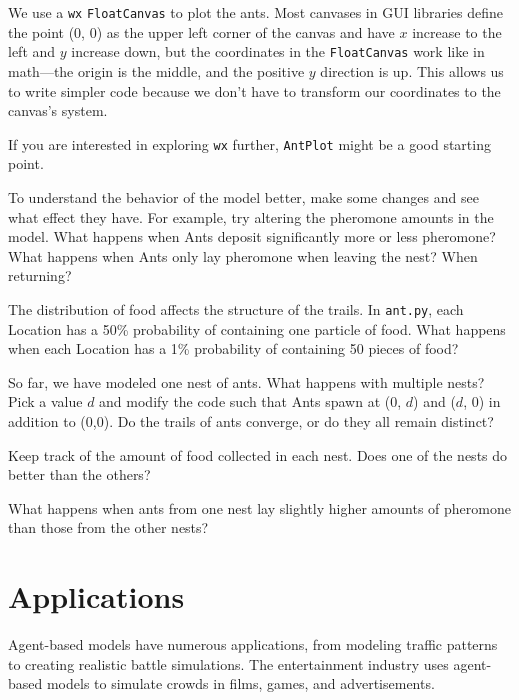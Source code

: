 \documentclass[10pt]{book}
\begin{document}
We use a {\tt wx} \texttt{FloatCanvas} to plot the ants.  Most
canvases in GUI libraries define the point (0, 0) as the upper left
corner of the canvas and have $x$ increase to the left and $y$ increase
down, but the coordinates in the \texttt{FloatCanvas} work like in
math---the origin is the middle, and the positive $y$ direction is up. This
allows us to write simpler code because we don't have to transform our
coordinates to the canvas's system.

If you are interested in exploring \texttt{wx}
further, \texttt{AntPlot} might be a good starting point.


\begin{exercise}

To understand the behavior of the model better, make some changes
and see what effect they have.  For example, try altering the
pheromone amounts in the model.
What
happens when Ants deposit significantly more or less pheromone?
What happens when
Ants only lay pheromone when leaving the nest? When returning? 
\end{exercise}

\begin{exercise}

The distribution of food affects the structure of the trails.
In \texttt{ant.py}, each Location has a 50\% probability of
containing one particle of food.  What happens when each Location has
a 1\% probability of containing 50 pieces of food?
\end{exercise}

\begin{exercise}

So far, we have modeled one nest of ants.
What happens with multiple nests? Pick a value $d$ and
modify the code such that Ants spawn at (0, $d$) and ($d$, 0) in addition
to (0,0).  Do the trails of ants converge, or do they all remain
distinct? 

Keep track of the amount of food
collected in each nest. Does one of the nests do better than the
others?

What happens when ants from
one nest lay slightly higher amounts of pheromone than those from the
other nests?
\end{exercise}


\section{Applications}

Agent-based models have numerous applications,
from modeling traffic patterns to creating realistic battle
simulations.  The entertainment industry uses agent-based
models to simulate crowds in films, games, and advertisements.
\end{document}
